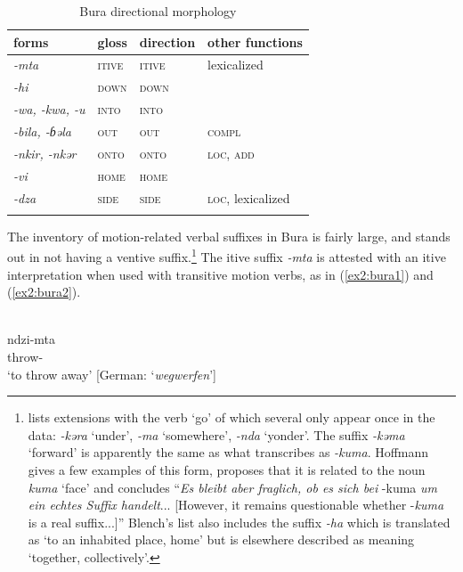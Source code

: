\begin{table}[H]
	\caption{Bura directional morphology}
	\label{tab:bura}
	\begin{tabular}{llll} %
		\lsptoprule
		forms & gloss & direction  & other functions  \\ %
		\midrule
		\textit{-mta}  &  \textsc{itive}  &  \textsc{itive} &   lexicalized  \\
		\textit{-hi}  &  \textsc{down}  &   \textsc{down}  &    \\
		\textit{-wa, -kwa, -u}  &  \textsc{into}  & \textsc{into}  &    \\
		\textit{-bila, -ɓəla}  &  \textsc{out}  &  \textsc{out} & \textsc{compl}  \\
		\textit{-nkir, -nkər}  &  \textsc{onto}  &   \textsc{onto}  &  \textsc{loc, add} \\		
		\textit{-vi}  &  \textsc{home}  &   \textsc{home}  &   \\	
		\textit{-dza}  &  \textsc{side}  &   \textsc{side}  & \textsc{loc}, lexicalized  \\			
		\lspbottomrule
	\end{tabular}
\end{table} 

The inventory of motion-related verbal suffixes in Bura is fairly large, and stands out in not having a ventive suffix.\footnote{\citet[3]{blenchBuraVerbalExtensions2010} lists extensions with the verb `go' of which several only appear once in the data: \textit{-kəra} `under', \textit{-ma} `somewhere', \textit{-nda} `yonder'. The suffix \textit{-kəma} `forward' is apparently the same as what \citet[284]{hoffmannUntersuchungenZurStruktur1955} transcribes as \textit{-kuma}. Hoffmann gives a few examples of this form, proposes that it is related to the noun \textit{kuma} `face' and concludes ``\textit{Es bleibt aber fraglich, ob es sich bei} -kuma \textit{um ein echtes Suffix handelt}... [However, it remains questionable whether -\textit{kuma} is a real suffix...]'' Blench's list also includes the suffix \textit{-ha} which is translated as `to an inhabited place, home' but is elsewhere described as meaning `together, collectively'.} The itive suffix \textit{-mta} is attested with an itive interpretation when used with transitive motion verbs, as in (\ref{ex2:bura1}) and (\ref{ex2:bura2}). 

\ea\label{ex2:bura1}
 \\
\gll ndzi-mta \\
throw-	\\
\glt `to throw away' [German: `\textit{wegwerfen}']

